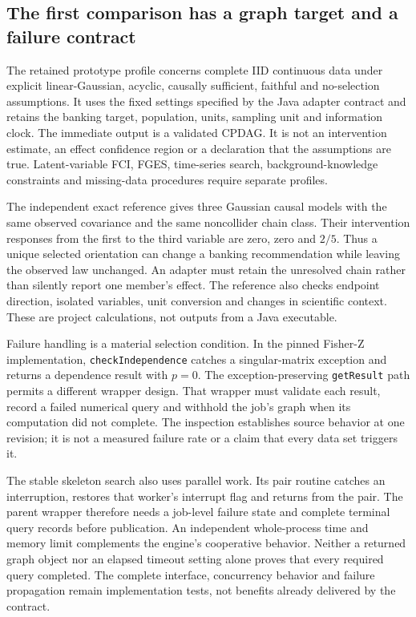 \hypertarget{the-first-comparison-has-a-graph-target-and-a-failure-contract}{%
\subsection{The first comparison has a graph target and a failure
contract}\label{the-first-comparison-has-a-graph-target-and-a-failure-contract}}

The retained prototype profile concerns complete IID continuous data
under explicit linear-Gaussian, acyclic, causally sufficient, faithful
and no-selection assumptions. It uses the fixed settings specified by
the Java adapter contract and retains the banking target, population,
units, sampling unit and information clock. The immediate output is a
validated CPDAG. It is not an intervention estimate, an effect
confidence region or a declaration that the assumptions are true.
Latent-variable FCI, FGES, time-series search, background-knowledge
constraints and missing-data procedures require separate profiles.
\citep{exec13_java_adapter_contract}

The independent exact reference gives three Gaussian causal models with
the same observed covariance and the same noncollider chain class. Their
intervention responses from the first to the third variable are zero,
zero and \(2/5\). Thus a unique selected orientation can change a
banking recommendation while leaving the observed law unchanged. An
adapter must retain the unresolved chain rather than silently report one
member's effect. The reference also checks endpoint direction, isolated
variables, unit conversion and changes in scientific context. These are
project calculations, not outputs from a Java executable.
\citep{exec13_java_adapter_oracles}

Failure handling is a material selection condition. In the pinned
Fisher-Z implementation, \texttt{checkIndependence} catches a
singular-matrix exception and returns a dependence result with \(p=0\).
The exception-preserving \texttt{getResult} path permits a different
wrapper design. That wrapper must validate each result, record a failed
numerical query and withhold the job's graph when its computation did
not complete. The inspection establishes source behavior at one
revision; it is not a measured failure rate or a claim that every data
set triggers it. \citep{exec13_java_tetrad}

The stable skeleton search also uses parallel work. Its pair routine
catches an interruption, restores that worker's interrupt flag and
returns from the pair. The parent wrapper therefore needs a job-level
failure state and complete terminal query records before publication. An
independent whole-process time and memory limit complements the engine's
cooperative behavior. Neither a returned graph object nor an elapsed
timeout setting alone proves that every required query completed. The
complete interface, concurrency behavior and failure propagation remain
implementation tests, not benefits already delivered by the contract.
\citep{exec13_java_adapter_source,
exec13_java_adapter_contract,exec13_tetrad_reuse_decision}

